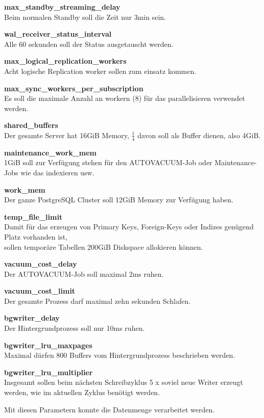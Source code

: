 \begin{flushleft}
\begin{description}
        \item \textbf{max\_standby\_streaming\_delay}\hfill \\Beim normalen Standby soll die Zeit nur 3min sein.
        \item \textbf{wal\_receiver\_status\_interval}\hfill \\Alle 60 sekunden soll der Status ausgetauscht werden.
        \item \textbf{max\_logical\_replication\_workers}\hfill \\Acht logische Replication worker sollen zum einsatz kommen.
        \item \textbf{max\_sync\_workers\_per\_subscription}\hfill \\Es soll die maximale Anzahl an workern (8) für das parallelisieren verwendet werden.
        \item \textbf{shared\_buffers}\hfill \\Der gesamte Server hat 16GiB Memory, \(\frac{1}{4}\) davon soll als Buffer dienen, also 4GiB.
        \item \textbf{maintenance\_work\_mem}\hfill \\1GiB soll zur Verfügung stehen für den \Gls{AUTOVACUUM}-Job oder Maintenance-Jobs wie das indexieren usw.
        \item \textbf{work\_mem}\hfill \\Der ganze \Gls{PostgreSQL Cluster} soll 12GiB Memory zur Verfügung haben.
        \item \textbf{temp\_file\_limit}\hfill \\Damit für das erzeugen von Primary Keys, Foreign-Keys oder Indizes genügend Platz vorhanden ist,\\sollen temporäre Tabellen 200GiB Diskspace allokieren können.
        \item \textbf{vacuum\_cost\_delay}\hfill \\Der \Gls{AUTOVACUUM}-Job soll maximal 2ms ruhen.
        \item \textbf{vacuum\_cost\_limit}\hfill \\Der gesamte Prozess darf maximal zehn sekunden Schlafen.
        \item \textbf{bgwriter\_delay}\hfill \\Der Hintergrundprozess soll nur 10ms ruhen.
        \item \textbf{bgwriter\_lru\_maxpages}\hfill \\Maximal dürfen 800 Buffers vom Hintergrundprozess beschrieben werden.
        \item \textbf{bgwriter\_lru\_multiplier}\hfill \\Insgesamt sollen beim nächsten Schreibzyklus 5 x soviel neue Writer erzeugt werden, wie im aktuellen Zyklus benötigt werden.
    \end{description}
    Mit diesen Parametern konnte die Datenmenge verarbeitet werden.
\end{flushleft}
